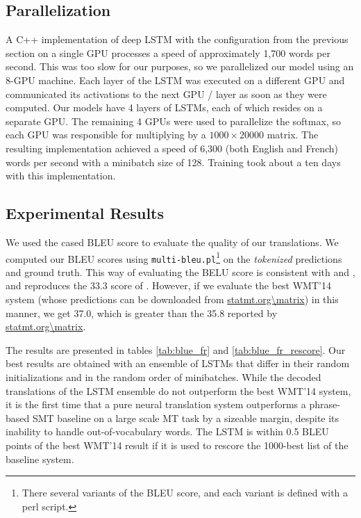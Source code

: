 \documentclass{article}
\begin{document}
\subsection{Parallelization}

A C++ implementation of deep LSTM with the configuration from the
previous section on a single GPU processes a speed of approximately
1,700 words per second.  This was too slow for our purposes, so we 
parallelized our model using an 8-GPU machine.  Each layer of the LSTM
was executed on a different GPU and communicated its activations
to the next GPU / layer as soon as they were computed.  Our models
have 4 layers of LSTMs, each of which resides on a separate GPU.  The remaining
4 GPUs were used to parallelize the softmax, so each GPU was
responsible for multiplying by a $1000\times 20000$ matrix.  The
resulting implementation achieved a speed of 6,300 (both English and
French) words per second with a minibatch size of 128. 
Training took about a ten days with this implementation.

\subsection{Experimental Results}

We used the cased BLEU score \cite{bleu} to evaluate the quality of our
translations. We computed our BLEU scores using \texttt{multi-bleu.pl}\footnote{
There several variants of the BLEU score, and each variant is defined  with a perl script. } 
on the \emph{tokenized} predictions and ground truth.
This way of evaluating the BELU score is consistent with \cite{cho14} and \cite{bog14}, and reproduces
the 33.3 score of \cite{wmt14_en_fr}.
However, if we evaluate the best WMT'14 system \cite{durrani-EtAl:2014:W14-33}
(whose predictions can be downloaded from \url{statmt.org\matrix}) in this manner, we get   
37.0, which is greater than the 35.8 reported by \url{statmt.org\matrix}.  

The results are presented in tables \ref{tab:blue_fr} and
\ref{tab:blue_fr_rescore}.  Our best results are obtained with an
ensemble of LSTMs that differ in their random initializations and
in the random order of minibatches.  While the decoded translations of the
LSTM ensemble do not outperform the best WMT'14 system, it is the first time
that a pure neural translation system outperforms a 
phrase-based SMT baseline on a large scale MT task by a sizeable margin,
despite its inability to handle out-of-vocabulary words.  The LSTM
is within 0.5 BLEU points of the best WMT'14 result if it is used to rescore the 1000-best
list of the baseline system.
\end{document}
